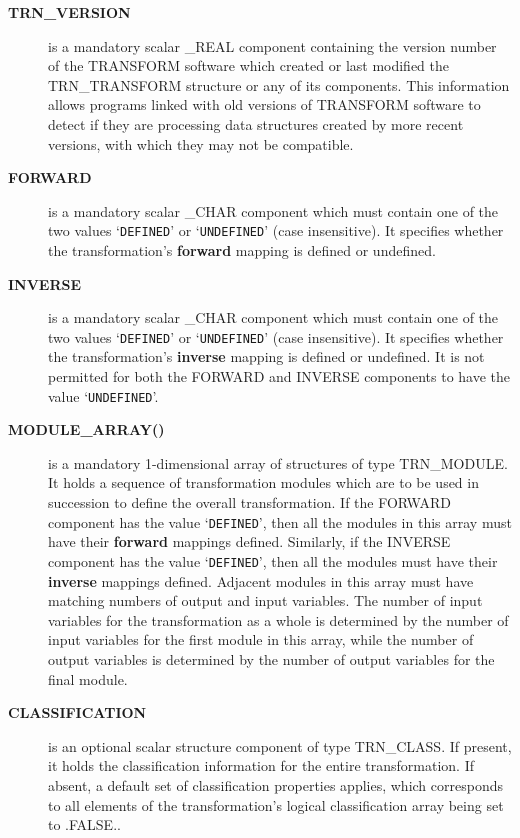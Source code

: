 \documentclass[twoside,11pt]{article}
\newcommand{\name}[1]{\mbox{\small{#1}}}
\begin{document}
\begin{description}

\item[\textbf{\name{TRN\_VERSION}}] is a mandatory scalar \name{\_REAL} component
containing the version number of the \name{TRANSFORM} software which created
or last modified the \name{TRN\_TRANSFORM} structure or any of its
components. 
This information allows programs linked with old versions of
\name{TRANSFORM} software to detect if they are processing data structures
created by more recent versions, with which they may not be compatible. 

\item[\textbf{\name{FORWARD}}] is a mandatory scalar \name{\_CHAR} component which
must contain one of the two values `\verb#DEFINED#' or `\verb#UNDEFINED#' (case
insensitive). 
It specifies whether the transformation's \textbf{forward} mapping is defined
or undefined. 

\item[\textbf{\name{INVERSE}}] is a mandatory scalar \name{\_CHAR} component which
must contain one of the two values `\verb#DEFINED#' or `\verb#UNDEFINED#' (case
insensitive). 
It specifies whether the transformation's \textbf{inverse} mapping is defined
or undefined.
It is not permitted for both the \name{FORWARD} and \name{INVERSE} 
components to have the value `\verb#UNDEFINED#'.

\item[\textbf{\name{MODULE\_ARRAY()}}] is a mandatory 1-dimensional array of
structures of type \name{TRN\_MODULE}.
It holds a sequence of transformation modules which are to be used in
succession to define the overall transformation.
If the \name{FORWARD} component has the value `\verb#DEFINED#', then all the
modules in this array must have their \textbf{forward} mappings defined.
Similarly, if the \name{INVERSE} component has the value `\verb#DEFINED#', then
all the modules must have their \textbf{inverse} mappings defined.
Adjacent modules in this array must have matching numbers of output and input
variables. 
The number of input variables for the transformation as a whole is
determined by the number of input variables for the first module in this
array, while the number of output variables is determined by the number of
output variables for the final module. 

\item[\textbf{\name{CLASSIFICATION}}] is an optional scalar structure component
of type \name{TRN\_CLASS}.  If present, it holds the classification
information for the entire transformation.  If absent, a default set of
classification properties applies, which corresponds to all elements of the
transformation's logical classification array being set to \name{.FALSE.}.

\end{description}
\end{document}
